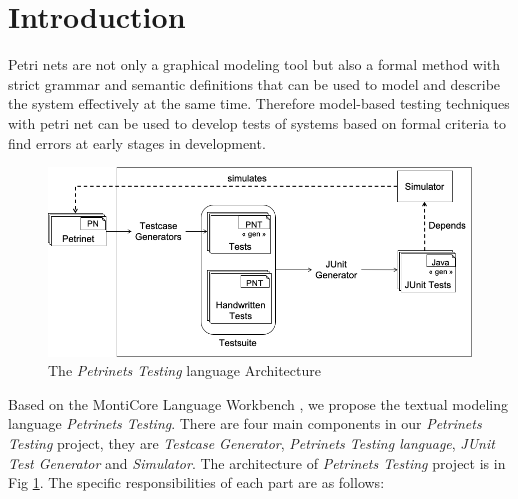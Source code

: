 
\section{Introduction}

Petri nets are not only a graphical modeling tool but also a formal method with strict grammar and semantic definitions that can be used to model and describe the system effectively at the same time. Therefore model-based testing techniques with petri net can be used to develop tests of systems based on formal criteria to find errors at early stages in development.

\begin{figure}
  \centering
  \includegraphics[scale=0.4]{src/pic/arch.png}
  \caption{The \emph{Petrinets Testing} language Architecture}
  \label{fig:arch}
\end{figure}

Based on the MontiCore Language Workbench \cite{monticore2020}, we propose the textual modeling language \emph{Petrinets Testing}. There are four main components in our \emph{Petrinets Testing} project, they are \emph{Testcase Generator}, \emph{Petrinets Testing language}, \emph{JUnit Test Generator} and \emph{Simulator}. The architecture of \emph{Petrinets Testing} project is in Fig \ref{fig:arch}. The specific responsibilities of each part are as follows:

